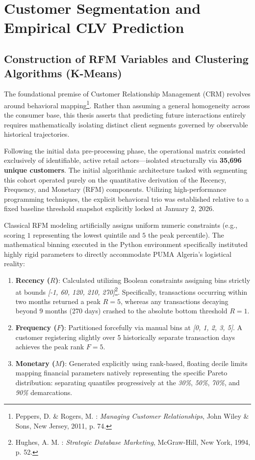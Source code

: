 \documentclass[12pt,a4paper]{report}
\begin{document}
\setcounter{chapter}{3} 
\setcounter{section}{1}

\section{Customer Segmentation and Empirical CLV Prediction}

\subsection{Construction of RFM Variables and Clustering Algorithms (K-Means)}
The foundational premise of Customer Relationship Management (CRM) revolves around behavioral mapping\footnote{Peppers, D. \& Rogers, M. : \textit{Managing Customer Relationships}, John Wiley \& Sons, New Jersey, 2011, p. 74.}. Rather than assuming a general homogeneity across the consumer base, this thesis asserts that predicting future interactions entirely requires mathematically isolating distinct client segments governed by observable historical trajectories.

Following the initial data pre-processing phase, the operational matrix consisted exclusively of identifiable, active retail actors—isolated structurally via \textbf{35,696 unique customers}. The initial algorithmic architecture tasked with segmenting this cohort operated purely on the quantitative derivation of the Recency, Frequency, and Monetary (RFM) components. Utilizing high-performance programming techniques, the explicit behavioral trio was established relative to a fixed baseline threshold snapshot explicitly locked at January 2, 2026.

Classical RFM modeling artificially assigns uniform numeric constraints (e.g., scoring $1$ representing the lowest quintile and $5$ the peak percentile). The mathematical binning executed in the Python environment specifically instituted highly rigid parameters to directly accommodate PUMA Algeria's logistical reality:
\begin{enumerate}
    \item \textbf{Recency ($R$)}: Calculated utilizing Boolean constraints assigning bins strictly at bounds \textit{[-1, 60, 120, 210, 270]}\footnote{Hughes, A. M. : \textit{Strategic Database Marketing}, McGraw-Hill, New York, 1994, p. 52.}. Specifically, transactions occurring within two months returned a peak $R=5$, whereas any transactions decaying beyond 9 months (270 days) crashed to the absolute bottom threshold $R=1$.
    \item \textbf{Frequency ($F$)}: Partitioned forcefully via manual bins at \textit{[0, 1, 2, 3, 5]}. A customer registering slightly over 5 historically separate transaction days achieves the peak rank $F=5$.
    \item \textbf{Monetary ($M$)}: Generated explicitly using rank-based, floating decile limits mapping financial parameters natively representing the specific Pareto distribution: separating quantiles progressively at the \textit{30\%}, \textit{50\%}, \textit{70\%}, and \textit{90\%} demarcations.
\end{enumerate}
\end{document}
